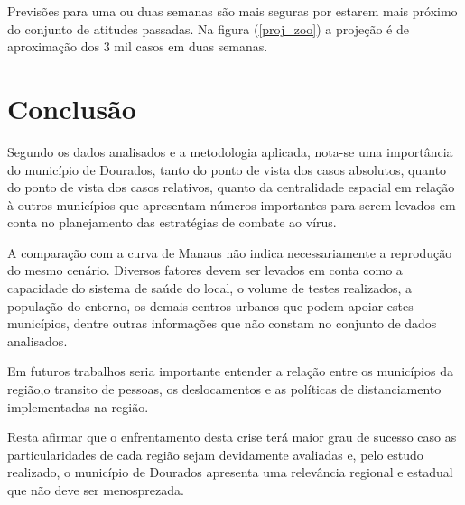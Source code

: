 \documentclass[12pt]{article}
\begin{document}
Previsões para uma ou duas semanas são mais seguras por estarem mais próximo do conjunto de atitudes passadas. Na figura (\ref{proj_zoo}) a projeção é de aproximação dos 3 mil casos em duas semanas. 

     

\section{Conclusão}\label{conc}

Segundo os dados analisados e a metodologia aplicada, nota-se uma importância do município de Dourados, tanto do ponto de vista dos casos absolutos, quanto do ponto de vista dos casos relativos, quanto da centralidade espacial em relação à outros municípios que apresentam números importantes para serem levados em conta no planejamento das estratégias de combate ao vírus.

A comparação com a curva de Manaus não indica necessariamente a reprodução do mesmo cenário. Diversos fatores devem ser levados em conta como a capacidade do sistema de saúde do local, o volume de testes realizados, a população do entorno, os demais centros urbanos que podem apoiar estes municípios, dentre outras informações que não constam no conjunto de dados analisados.

Em futuros trabalhos seria importante entender a relação entre os municípios da região,o transito de pessoas, os deslocamentos e as políticas de distanciamento implementadas na região.

Resta afirmar que o enfrentamento desta crise terá maior grau de sucesso caso as particularidades de cada região sejam devidamente avaliadas e, pelo estudo realizado, o município de Dourados apresenta uma relevância regional e estadual que não deve ser menosprezada.



\end{document}
